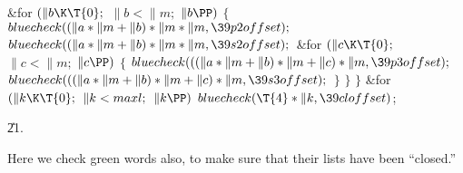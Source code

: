\&{for} ${}(\|b\K\T{0};{}$ ${}\|b<\|m;{}$ ${}\|b\PP){}$\5
${}\{{}$\1\6
${}\\{bluecheck}((\|a*\|m+\|b)*\|m*\|m,\39\\{p2offset});{}$\6
${}\\{bluecheck}((\|a*\|m+\|b)*\|m*\|m,\39\\{s2offset});{}$\6
\&{for} ${}(\|c\K\T{0};{}$ ${}\|c<\|m;{}$ ${}\|c\PP){}$\5
${}\{{}$\1\6
${}\\{bluecheck}(((\|a*\|m+\|b)*\|m+\|c)*\|m,\39\\{p3offset});{}$\6
${}\\{bluecheck}(((\|a*\|m+\|b)*\|m+\|c)*\|m,\39\\{s3offset});{}$\6
\4${}\}{}$\2\6
\4${}\}{}$\2\6
\4${}\}{}$\2\6
\&{for} ${}(\|k\K\T{0};{}$ ${}\|k<\\{maxl};{}$ ${}\|k\PP){}$\1\5
${}\\{bluecheck}(\T{4}*\|k,\39\\{cloffset}){}$;\2\par
\U21.\fi

Here we check green words also, to make sure that their lists have
been ``closed.''

